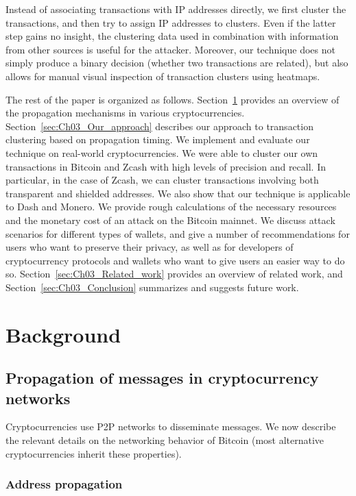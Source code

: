 Instead of associating transactions with IP addresses directly, we first cluster the transactions, and then try to assign IP addresses to clusters.
Even if the latter step gains no insight, the clustering data used in combination with information from other sources is useful for the attacker.
Moreover, our technique does not simply produce a binary decision (whether two transactions are related), but also allows for manual visual inspection of transaction clusters using heatmaps.

The rest of the paper is organized as follows.
Section~\ref{sec:Ch03_Background} provides an overview of the propagation mechanisms in various cryptocurrencies.
Section~\ref{sec:Ch03_Our_approach} describes our approach to transaction clustering based on propagation timing.
We implement and evaluate our technique on real-world cryptocurrencies.
We were able to cluster our own transactions in Bitcoin and Zcash with high levels of precision and recall.
In particular, in the case of Zcash, we can cluster transactions involving both transparent and shielded addresses.
We also show that our technique is applicable to Dash and Monero.
We provide rough calculations of the necessary resources and the monetary cost of an attack on the Bitcoin mainnet.
We discuss attack scenarios for different types of wallets, and give a number of recommendations for users who want to preserve their privacy, as well as for developers of cryptocurrency protocols and wallets who want to give users an easier way to do so.
Section~\ref{sec:Ch03_Related_work} provides an overview of related work, and Section~\ref{sec:Ch03_Conclusion} summarizes and suggests future work.


\section{Background} \label{sec:Ch03_Background}

\subsection{Propagation of messages in cryptocurrency networks}

Cryptocurrencies use P2P networks to disseminate messages.
We now describe the relevant details on the networking behavior of Bitcoin (most alternative cryptocurrencies inherit these properties).

\subsubsection{Address propagation}


